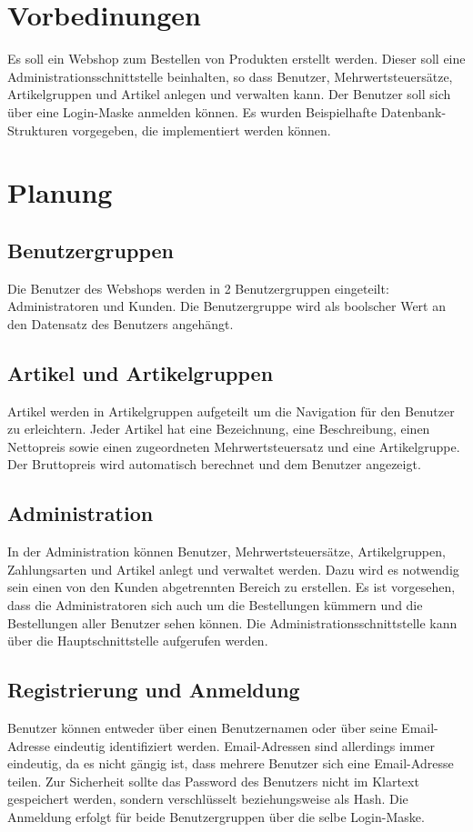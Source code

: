 \documentclass[a4paper,oneside,12pt]{scrartcl}
\begin{document}
\section{Vorbedinungen}
Es soll ein Webshop zum Bestellen von Produkten erstellt werden. Dieser
soll eine Administrationsschnittstelle beinhalten, so dass Benutzer, Mehrwertsteuersätze,
Artikelgruppen und Artikel anlegen und verwalten kann.
Der Benutzer soll sich über eine Login-Maske anmelden können.
Es wurden Beispielhafte Datenbank-Strukturen vorgegeben, die implementiert werden können.

\section{Planung}

\subsection{Benutzergruppen}
Die Benutzer des Webshops werden in 2 Benutzergruppen eingeteilt: Administratoren und Kunden.
Die Benutzergruppe wird als boolscher Wert an den Datensatz des Benutzers angehängt.

\subsection{Artikel und Artikelgruppen}
Artikel werden in Artikelgruppen aufgeteilt um die Navigation für den Benutzer zu erleichtern.
Jeder Artikel hat eine Bezeichnung, eine Beschreibung, einen Nettopreis sowie einen 
zugeordneten Mehrwertsteuersatz und eine Artikelgruppe. Der Bruttopreis wird automatisch 
berechnet und dem Benutzer angezeigt.

\subsection{Administration}
In der Administration können Benutzer, Mehrwertsteuersätze, Artikelgruppen, Zahlungsarten und Artikel anlegt
und verwaltet werden. Dazu wird es notwendig sein einen von den Kunden abgetrennten
Bereich zu erstellen. Es ist vorgesehen, dass die Administratoren sich auch um die
Bestellungen kümmern und die Bestellungen aller Benutzer sehen können.
Die Administrationsschnittstelle kann über die Hauptschnittstelle aufgerufen werden.

\subsection{Registrierung und Anmeldung}
Benutzer können entweder über einen Benutzernamen oder über seine Email-Adresse eindeutig
identifiziert werden. Email-Adressen sind allerdings immer eindeutig, da es nicht gängig ist,
dass mehrere Benutzer sich eine Email-Adresse teilen. Zur Sicherheit sollte das Password des
Benutzers nicht im Klartext gespeichert werden, sondern verschlüsselt beziehungsweise als
Hash. Die Anmeldung erfolgt für beide Benutzergruppen über die selbe Login-Maske. 
\end{document}
